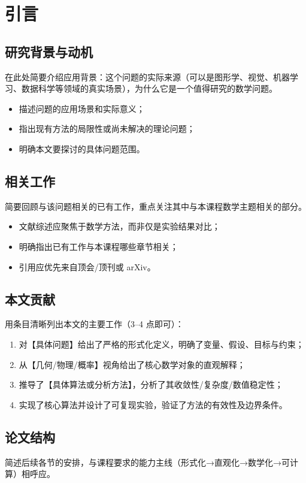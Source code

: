 \section{引言}

\subsection{研究背景与动机}

在此处简要介绍应用背景：这个问题的实际来源（可以是图形学、视觉、机器学习、数据科学等领域的真实场景），为什么它是一个值得研究的数学问题。

\begin{itemize}
    \item 描述问题的应用场景和实际意义；
    \item 指出现有方法的局限性或尚未解决的理论问题；
    \item 明确本文要探讨的具体问题范围。
\end{itemize}

\subsection{相关工作}

简要回顾与该问题相关的已有工作，重点关注其中与本课程数学主题相关的部分。

\begin{itemize}
    \item 文献综述应聚焦于数学方法，而非仅是实验结果对比；
    \item 明确指出已有工作与本课程哪些章节相关；
    \item 引用应优先来自顶会/顶刊或 arXiv。
\end{itemize}


\subsection{本文贡献}

用条目清晰列出本文的主要工作（3--4 点即可）：

\begin{enumerate}
    \item 对【具体问题】给出了严格的形式化定义，明确了变量、假设、目标与约束；
    \item 从【几何/物理/概率】视角给出了核心数学对象的直观解释；
    \item 推导了【具体算法或分析方法】，分析了其收敛性/复杂度/数值稳定性；
    \item 实现了核心算法并设计了可复现实验，验证了方法的有效性及边界条件。
\end{enumerate}

\subsection{论文结构}

简述后续各节的安排，与课程要求的能力主线（形式化→直观化→数学化→可计算）相呼应。
